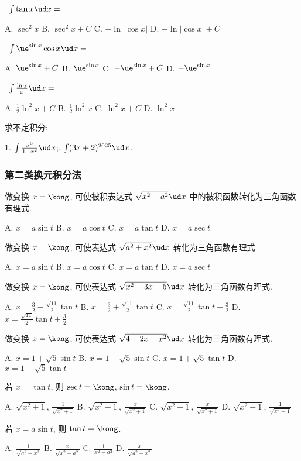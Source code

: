 \bq{}{}
\ $\int\tan x\ud x=$

A. $\sec^2 x$\quad
B. $\sec^2 x+C$\quad
C. $-\ln|\cos x|$\quad
D. $-\ln|\cos x|+C$
\eq

\bq{}{}
\ $\int \ue^{\sin x}\cos x\ud x=$

A. $\ue^{\sin x}+C$\quad
B. $\ue^{\sin x}$\quad
C. $-\ue^{\sin x}+C$\quad
D. $-\ue^{\sin x}$
\eq

\bq{}{}
\ $\int\frac{\ln x}{x}\ud x=$

A. $\frac12\ln^2x+C$\quad
B. $\frac12\ln^2x$\quad
C. $\ln^2x+C$\quad
D. $\ln^2x$
\eq

\bq{}{}
求不定积分:

1. $\int\frac{x^3}{1+x^2}\ud x$;. $\int(3x+2)^{2025}\ud x$.
\eq

\subsubsection{第二类换元积分法}
做变换 $x=\kong$, 可使被积表达式 $\sqrt{x^2-a^2}\ud x$ 中的被积函数转化为三角函数有理式.

A. $x=a\sin t$\quad
B. $x=a\cos t$\quad
C. $x=a\tan t$\quad
D. $x=a\sec t$
\eq

做变换 $x=\kong$, 可使表达式 $\sqrt{a^2+x^2}\ud x$ 转化为三角函数有理式.

A. $x=a\sin t$\qquad
B. $x=a\cos t$\qquad
C. $x=a\tan t$\qquad
D. $x=a\sec t$
\eq

做变换 $x=\kong$, 可使表达式 $\sqrt{x^2-3x+5}\ud x$ 转化为三角函数有理式.

A. $x=\frac32-\frac{\sqrt{11}}{2}\tan t$\qquad
B. $x=\frac32+\frac{\sqrt{11}}{2}\tan t$\qquad
C. $x=\frac{\sqrt{11}}{2}\tan t-\frac32$\qquad
D. $x=\frac{\sqrt{11}}{2}\tan t+\frac32$
\eq

做变换 $x=\kong$, 可使表达式 $\sqrt{4+2x-x^2}\ud x$ 转化为三角函数有理式.

A. $x=1+\sqrt{5}\sin t$\qquad
B. $x=1-\sqrt{5}\sin t$\qquad
C. $x=1+\sqrt{5}\tan t$\qquad
D. $x=1-\sqrt{5}\tan t$
\eq

若 $x=\tan t$, 则 $\sec t=\kong$, $\sin t=\kong$.

A. $\sqrt{x^2+1}$, $\frac1{\sqrt{x^2+1}}$\qquad
B. $\sqrt{x^2-1}$, $\frac{x}{\sqrt{x^2+1}}$\qquad
C. $\sqrt{x^2+1}$, $\frac{x}{\sqrt{x^2+1}}$\qquad
D. $\sqrt{x^2-1}$, $\frac1{\sqrt{x^2+1}}$
\eq

若 $x=a\sin t$, 则 $\tan t=\kong$.

A. $\frac1{\sqrt{a^2-x^2}}$\qquad
B. $\frac{x}{\sqrt{x^2-a^2}}$\qquad
C. $\frac1{x^2-a^2}$\qquad
D. $\frac{x}{\sqrt{a^2-x^2}}$
\eq

